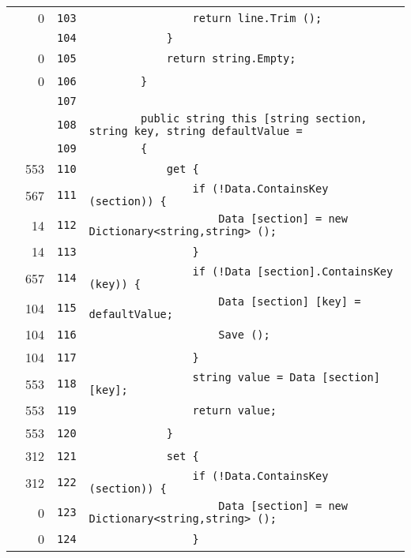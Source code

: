 \documentclass[a4paper,10pt]{article}
\begin{document}
\begin{longtable}[l]{lrrl}
\cellcolor{red} & 0 & \verb~103~ & \verb~                return line.Trim ();~\\
\cellcolor{gray} &  & \verb~104~ & \verb~            }~\\
\cellcolor{red} & 0 & \verb~105~ & \verb~            return string.Empty;~\\
\cellcolor{red} & 0 & \verb~106~ & \verb~        }~\\
\cellcolor{gray} &  & \verb~107~ & \verb~~\\
\cellcolor{gray} &  & \verb~108~ & \verb~        public string this [string section, string key, string defaultValue = ~\\
\cellcolor{gray} &  & \verb~109~ & \verb~        {~\\
\cellcolor{green} & 553 & \verb~110~ & \verb~            get {~\\
\cellcolor{green} & 567 & \verb~111~ & \verb~                if (!Data.ContainsKey (section)) {~\\
\cellcolor{green} & 14 & \verb~112~ & \verb~                    Data [section] = new Dictionary<string,string> ();~\\
\cellcolor{green} & 14 & \verb~113~ & \verb~                }~\\
\cellcolor{green} & 657 & \verb~114~ & \verb~                if (!Data [section].ContainsKey (key)) {~\\
\cellcolor{green} & 104 & \verb~115~ & \verb~                    Data [section] [key] = defaultValue;~\\
\cellcolor{green} & 104 & \verb~116~ & \verb~                    Save ();~\\
\cellcolor{green} & 104 & \verb~117~ & \verb~                }~\\
\cellcolor{green} & 553 & \verb~118~ & \verb~                string value = Data [section] [key];~\\
\cellcolor{green} & 553 & \verb~119~ & \verb~                return value;~\\
\cellcolor{green} & 553 & \verb~120~ & \verb~            }~\\
\cellcolor{green} & 312 & \verb~121~ & \verb~            set {~\\
\cellcolor{green} & 312 & \verb~122~ & \verb~                if (!Data.ContainsKey (section)) {~\\
\cellcolor{red} & 0 & \verb~123~ & \verb~                    Data [section] = new Dictionary<string,string> ();~\\
\cellcolor{red} & 0 & \verb~124~ & \verb~                }~\\

\end{longtable}
\end{document}
